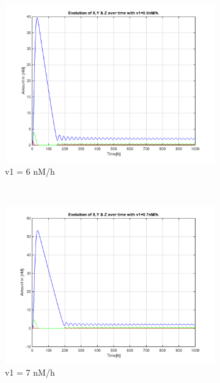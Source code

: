 \documentclass[10pt,a4paper,oneside,twocolumn]{article}
\numberwithin{equation}{section} %
\begin{document}
\begin{figure}
	\begin{subfigure}[b]{0.3\textwidth}
	    \includegraphics[width=\textwidth]{LotsofthesameA/A-A6.png}
	    \caption{v1 = 6 nM/h}
	\end{subfigure}
	~ 
	\begin{subfigure}[b]{0.3\textwidth}
	    \includegraphics[width=\textwidth]{LotsofthesameA/A-A7.png}
	    \caption{v1 = 7 nM/h}
	\end{subfigure}
	~ 
	\begin{subfigure}[b]{0.3\textwidth}

\end{subfigure}
\end{figure}
\end{document}
